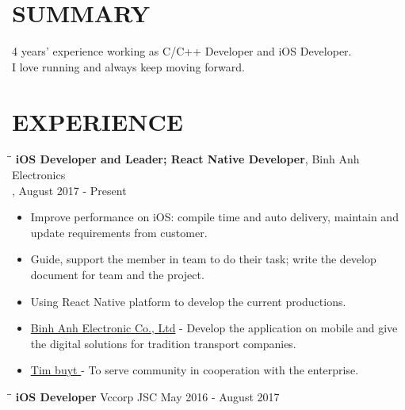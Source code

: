 \documentclass[margin, 10pt]{res}
\begin{document}
\begin{resume}
 
\section{SUMMARY}
   4 years' experience working as C/C++ Developer and iOS Developer.\\I love running and always keep moving forward.
 
\section{EXPERIENCE}
   \vspace{-0.1in}

   \begin{tabbing}
   \hspace{2.0in}\= \hspace{2.0in}\= \kill %
   {\bf iOS Developer and Leader; React Native Developer}, Binh Anh Electronics\\, August 2017 - Present
   \end{tabbing}\vspace{0pt} %

   \begin{itemize}
		\item Improve performance on iOS: compile time and auto delivery, maintain and update requirements from customer. 
		\item Guide, support the member in team to do their task; write the develop document for team and the project.
		\item Using React Native platform to develop the current productions.
		\item {\color{blue}\href{https://itunes.apple.com/vn/developer/binh-anh-electronic-co-ltd/id1020602455?l=vi&mt=8}{Binh Anh Electronic Co., Ltd}} - Develop the application on mobile and give the digital solutions for tradition transport companies.
		\item {\color{blue}\href{https://itunes.apple.com/app/id947703352}{ Tim buyt }} - To serve community in cooperation with the enterprise.
   \end{itemize}

   \begin{tabbing}
   \hspace{2.0in}\= \hspace{2.0in}\= \kill %
   {\bf iOS Developer} \>Vccorp JSC \>May 2016 - August 2017\\
   \end{tabbing}\vspace{-20pt} %


\end{resume}
\end{document}
